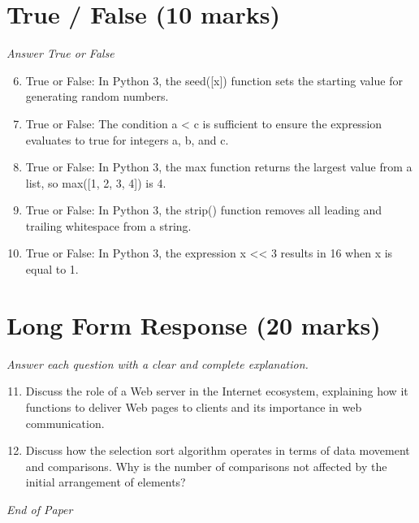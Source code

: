 \documentclass[12pt]{article}
\begin{document}
\section*{True / False (10 marks)}
\textit{Answer True or False}
\begin{enumerate}[label=\arabic*.]
\setcounter{enumi}{5}
\item True or False: In Python 3, the seed([x]) function sets the starting value for generating random numbers.
\item True or False: The condition a \textless{} c is sufficient to ensure the expression evaluates to true for integers a, b, and c.
\item True or False: In Python 3, the max function returns the largest value from a list, so max([1, 2, 3, 4]) is 4.
\item True or False: In Python 3, the strip() function removes all leading and trailing whitespace from a string.
\item True or False: In Python 3, the expression x \textless{}\textless{} 3 results in 16 when x is equal to 1.
\end{enumerate}

\section*{Long Form Response (20 marks)}
\textit{Answer each question with a clear and complete explanation.}
\begin{enumerate}[label=\arabic*.]
\setcounter{enumi}{10}
\item Discuss the role of a Web server in the Internet ecosystem, explaining how it functions to deliver Web pages to clients and its importance in web communication.
\item Discuss how the selection sort algorithm operates in terms of data movement and comparisons. Why is the number of comparisons not affected by the initial arrangement of elements?
\end{enumerate}

\vfill
\noindent\textit{End of Paper}
\end{document}
